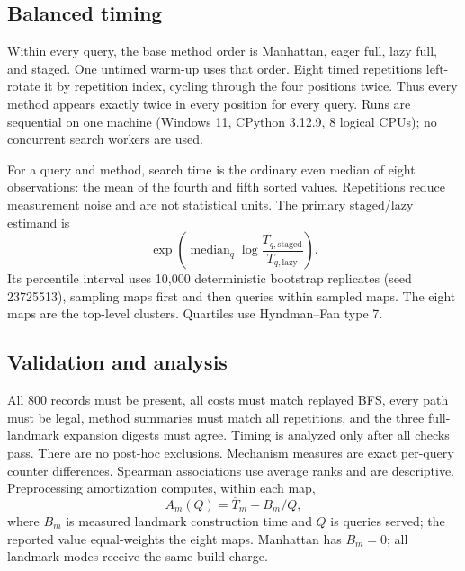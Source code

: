 \subsection{Balanced timing}

Within every query, the base method order is Manhattan, eager full, lazy full,
and staged.  One untimed warm-up uses that order.  Eight timed repetitions
left-rotate it by repetition index, cycling through the four positions twice.
Thus every method appears exactly twice in every position for every query.
Runs are sequential on one machine (Windows 11, CPython 3.12.9, 8 logical
CPUs); no concurrent search workers are used.

For a query and method, search time is the ordinary even median of eight
observations: the mean of the fourth and fifth sorted values.  Repetitions
reduce measurement noise and are not statistical units.  The primary
staged/lazy estimand is
\begin{equation}
 \exp\!\left(\operatorname{median}_{q}
     \log\frac{T_{q,\mathrm{staged}}}{T_{q,\mathrm{lazy}}}\right).
 \label{eq:ratio}
\end{equation}
Its percentile interval uses 10,000 deterministic bootstrap replicates
(seed 23725513), sampling maps first and then queries within sampled maps.
The eight maps are the top-level clusters.  Quartiles use Hyndman--Fan type 7.

\subsection{Validation and analysis}

All 800 records must be present, all costs must match replayed BFS, every path
must be legal, method summaries must match all repetitions, and the three
full-landmark expansion digests must agree.  Timing is analyzed only after all
checks pass.  There are no post-hoc exclusions.  Mechanism measures are exact per-query
counter differences.  Spearman associations use average ranks and are
descriptive.  Preprocessing amortization computes, within each map,
\begin{equation}
 A_m(Q)=\overline{T}_{m}+B_m/Q,
 \label{eq:amortization}
\end{equation}
where $B_m$ is measured landmark construction time and $Q$ is queries served;
the reported value equal-weights the eight maps.  Manhattan has $B_m=0$;
all landmark modes receive the same build charge.
